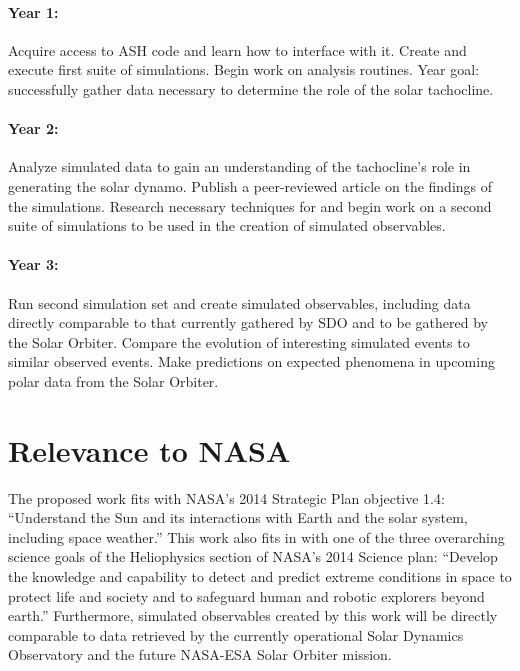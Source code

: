 \documentclass[aasms,12pt]{article}
\begin{document}
\paragraph{Year 1:}
Acquire access to ASH code and learn how to interface with it.
Create and execute first suite of simulations.  Begin work on analysis
routines.  Year goal: successfully gather data
necessary to determine the role of the solar tachocline.
\paragraph{Year 2:}
Analyze simulated data to gain an understanding of the tachocline's role in
generating the solar dynamo.  Publish a peer-reviewed article on the findings
of the simulations.  Research necessary techniques for and begin work on 
a second suite of simulations to be
used in the creation of simulated observables.  
\paragraph{Year 3:}
Run second simulation set and create simulated observables, including data
directly comparable to that currently gathered by SDO and to be gathered by the
Solar Orbiter.  Compare the evolution of interesting simulated
events to similar observed events.  Make predictions on expected phenomena in
upcoming polar data from the Solar Orbiter.


\newpage

\section{Relevance to NASA} 
The proposed work fits with NASA's 2014 Strategic Plan objective
1.4:
``Understand the Sun and its interactions with Earth and the solar
system, including space weather.''
This work also fits in with one of the three overarching science goals
of the Heliophysics section of NASA's 2014 Science plan: 
``Develop the
knowledge and capability to detect and predict extreme conditions in space to
protect life and society and to safeguard human and robotic explorers beyond
earth.''  Furthermore, simulated observables created by this work will be
directly comparable to data retrieved by the currently operational Solar
Dynamics Observatory and the future NASA-ESA Solar Orbiter mission.
\end{document}
